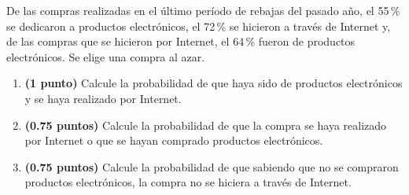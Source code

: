 
De las compras realizadas en el último período de rebajas del pasado año,
el 55\,\% se dedicaron a productos electrónicos, el 72\,\% se hicieron a
través de Internet y, de las compras que se hicieron por Internet, el
64\,\% fueron de productos electrónicos. Se elige una compra al azar.
\begin{enumerate}[label=\alph*)]
  \item \textbf{(1 punto)} Calcule la probabilidad de que haya sido de
  productos electrónicos y se haya realizado por Internet.
  \item \textbf{(0.75 puntos)} Calcule la probabilidad de que la compra
  se haya realizado por Internet o que se hayan comprado productos
  electrónicos.
  \item \textbf{(0.75 puntos)} Calcule la probabilidad de que sabiendo que
  no se compraron productos electrónicos, la compra no se hiciera a través
  de Internet.
\end{enumerate}
